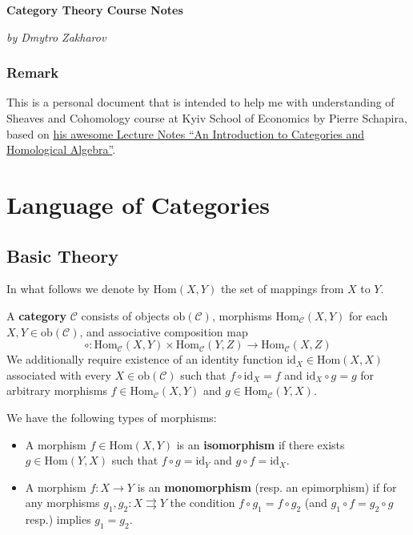 \documentclass{category-template}
\begin{document}
\begin{center}
    \textbf{\Huge{Category Theory Course Notes}}

    \textit{by Dmytro Zakharov}
\end{center}

\subsubsection*{Remark}

This is a personal document that is intended to help me with understanding of
Sheaves and Cohomology course at Kyiv School of Economics by Pierre Schapira,
based on
\href{https://webusers.imj-prg.fr/~pierre.schapira/LectNotes/HA.pdf}{his awesome
Lecture Notes ``An Introduction to Categories and Homological Algebra''}.

\section{Language of Categories}

\subsection{Basic Theory}

In what follows we denote by $\text{Hom}(X,Y)$ the set of mappings from $X$ to $Y$.

\begin{definition}[Category]
    A \textbf{category} $\mathcal{C}$ consists of objects $\text{ob}(\mathcal{C})$,
    morphisms $\text{Hom}_{\mathcal{C}}(X,Y)$ for each $X,Y \in
    \text{ob}(\mathcal{C})$, and associative composition map 
    \begin{equation*}
        \circ:
    \text{Hom}_{\mathcal{C}}(X,Y) \times \text{Hom}_{\mathcal{C}}(Y,Z) \to
    \text{Hom}_{\mathcal{C}}(X,Z)
    \end{equation*}
    We additionally require existence of an identity function $\text{id}_X \in
    \text{Hom}(X,X)$ associated with every $X \in \text{ob}(\mathcal{C})$ such
    that $f \circ \text{id}_X = f$ and $\text{id}_X \circ g = g$ for arbitrary
    morphisms $f \in \text{Hom}_{\mathcal{C}}(X,Y)$ and $g \in
    \text{Hom}_{\mathcal{C}}(Y,X)$.
\end{definition}

\begin{definition}
    We have the following types of morphisms:
    \begin{itemize}
        \item A morphism $f \in \text{Hom}(X, Y)$ is an \textbf{isomorphism} if
        there exists $g \in \text{Hom}(Y, X)$ such that $f \circ g =
        \text{id}_Y$ and $g \circ f = \text{id}_X$.
        \item A morphism $f: X \to Y$ is an \textbf{monomorphism} (resp. an 
        epimorphism) if for any morphisms $g_1,g_2: X \rightrightarrows Y$
        the condition $f \circ g_1 = f \circ g_2$ (and $g_1 \circ f = g_2 \circ g$ resp.)
        implies $g_1=g_2$. 
    \end{itemize}
\end{definition}
\end{document}
